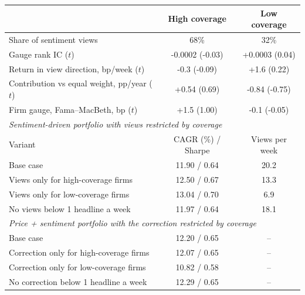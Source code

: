 \begin{tabular}{lcc}
\toprule
 & High coverage & Low coverage \\
\midrule
Share of sentiment views & 68\% & 32\% \\
Gauge rank IC ($t$) & -0.0002 (-0.03) & +0.0003 (0.04) \\
Return in view direction, bp/week ($t$) & -0.3 (-0.09) & +1.6 (0.22) \\
Contribution vs equal weight, pp/year ($t$) & +0.54 (0.69) & -0.84 (-0.75) \\
Firm gauge, Fama--MacBeth, bp ($t$) & +1.5 (1.00) & -0.1 (-0.05) \\
\midrule
\multicolumn{3}{l}{\emph{Sentiment-driven portfolio with views restricted by coverage}}\\
Variant & CAGR (\%) / Sharpe & Views per week \\
\midrule
Base case & 11.90 / 0.64 & 20.2 \\
Views only for high-coverage firms & 12.50 / 0.67 & 13.3 \\
Views only for low-coverage firms & 13.04 / 0.70 & 6.9 \\
No views below 1 headline a week & 11.97 / 0.64 & 18.1 \\
\midrule
\multicolumn{3}{l}{\emph{Price + sentiment portfolio with the correction restricted by coverage}}\\
\midrule
Base case & 12.20 / 0.65 & -- \\
Correction only for high-coverage firms & 12.07 / 0.65 & -- \\
Correction only for low-coverage firms & 10.82 / 0.58 & -- \\
No correction below 1 headline a week & 12.29 / 0.65 & -- \\
\bottomrule
\end{tabular}
